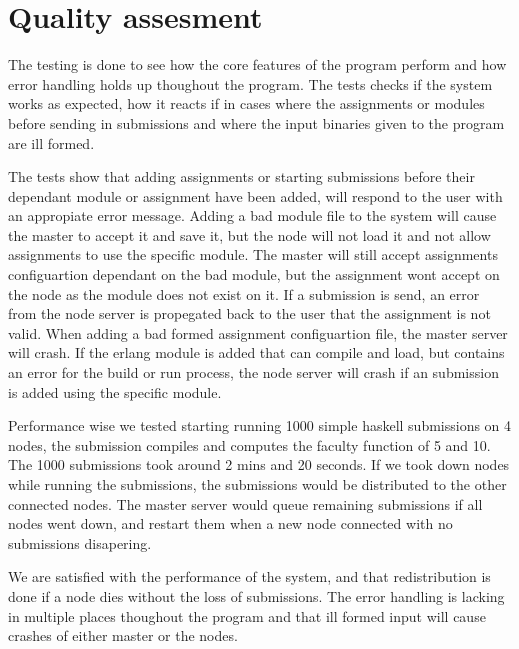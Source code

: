 \chapter{Quality assesment}
The testing is done to see how the core features of the program perform and how error handling holds up thoughout the program. The tests checks if the system works as expected, how it reacts if in cases where the assignments or modules before sending in submissions and where the input binaries given to the program are ill formed.

The tests show that adding assignments or starting submissions before their dependant module or assignment have been added, will respond to the user with an appropiate error message. Adding a bad module file to the system will cause the master to accept it and save it, but the node will not load it and not allow assignments to use the specific module. The master will still accept assignments configuartion dependant on the bad module, but the assignment wont accept on the node as the module does not exist on it. If a submission is send, an error from the node server is propegated back to the user that the assignment is not valid. When adding a bad formed assignment configuartion file, the master server will crash. If the erlang module is added that can compile and load, but contains an error for the build or run process, the node server will crash if an submission is added using the specific module.

Performance wise we tested starting running 1000 simple haskell submissions on 4 nodes, the submission compiles and computes the faculty function of 5 and 10. The 1000 submissions took around 2 mins and 20 seconds. If we took down nodes while running the submissions, the submissions would be distributed to the other connected nodes. The master server would queue remaining submissions if all nodes went down, and restart them when a new node connected with no submissions disapering.

We are satisfied with the performance of the system, and that redistribution is done if a node dies without the loss of submissions. The error handling is lacking in multiple places thoughout the program and that ill formed input will cause crashes of either master or the nodes.
